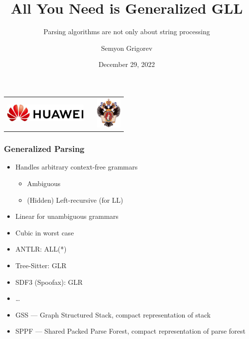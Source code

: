 \documentclass[xcolor=table,aspectratio=169]{beamer}
\title[All You Need is Generalized GLL]{All You Need is Generalized GLL}
\subtitle{Parsing algorithms are not only about string processing}
\author[Semyon Grigorev]{Semyon Grigorev}
\date{December 29, 2022}
\begin{document}
{
\begin{frame}[fragile]
  \begin{table}
  \centering
  \begin{tabularx}{\linewidth}{XcX}
    \includegraphics[height=0.9cm]{pictures/hu_logo.jpeg} \hfill
    & 
    & \hfill \includegraphics[height=1.6cm]{pictures/SPbGU_Logo.png}
  \end{tabularx}
  \end{table}
  \titlepage
\end{frame}
}



\begin{frame}[fragile]
  \frametitle{Generalized Parsing}  
  \begin{minipage}[t]{0.49\textwidth}
    \begin{itemize}
      \item Handles arbitrary context-free grammars
      \begin{itemize}
        \item Ambiguous
        \item (Hidden) Left-recursive (for LL)
      \end{itemize}
      \item Linear for unambiguous grammars 
      \item Cubic in worst case
    \end{itemize}
  \end{minipage}
  \pause  
  \begin{minipage}[t]{0.49\textwidth}
    \begin{itemize}
      \item ANTLR: ALL(*)
      \item Tree-Sitter: GLR
      \item SDF3 (Spoofax): GLR
      \item \ldots
    \end{itemize}
  \end{minipage}
  \vfill
  \pause
  \begin{itemize}
    \item GSS --- Graph Structured Stack, compact representation of stack
    \item SPPF --- Shared Packed Parse Forest, compact representation of parse forest
  \end{itemize}
\end{frame}
\end{document}
